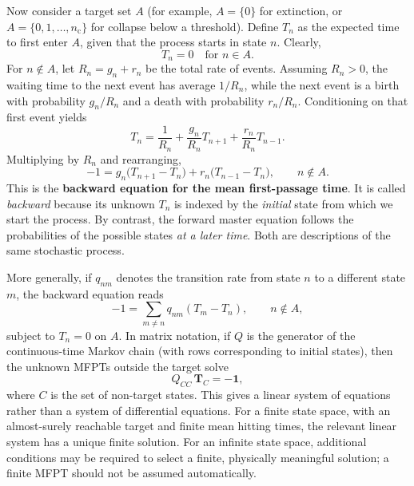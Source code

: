 Now consider a target set $A$ (for example, $A=\{0\}$ for extinction, or
$A=\{0,1,\ldots,n_{\mathrm c}\}$ for collapse below a threshold). Define
$T_n$ as the expected time to first enter $A$, given that the process starts
in state $n$. Clearly,
\begin{equation}
 T_n=0\quad\text{for }n\in A.
 \label{eq:mfpt-target-boundary}
\end{equation}
For $n\notin A$, let $R_n=g_n+r_n$ be the total rate of events. Assuming
$R_n>0$, the waiting time to the next event has average $1/R_n$, while the
next event is a birth with probability $g_n/R_n$ and a death with
probability $r_n/R_n$. Conditioning on that first event yields
\begin{equation}
 T_n=\frac{1}{R_n}
     +\frac{g_n}{R_n}T_{n+1}
     +\frac{r_n}{R_n}T_{n-1}.
 \label{eq:mfpt-first-step}
\end{equation}
Multiplying by $R_n$ and rearranging,
\begin{equation}
 \boxed{-1=g_n\bigl(T_{n+1}-T_n\bigr)
             +r_n\bigl(T_{n-1}-T_n\bigr),
             \qquad n\notin A.}
 \label{eq:mfpt-backward}
\end{equation}
This is the \textbf{backward equation for the mean first-passage time}.
It is called \emph{backward} because its unknown $T_n$ is indexed by the
\emph{initial} state from which we start the process. By contrast, the
forward master equation follows the probabilities of the possible states
\emph{at a later time}. Both are descriptions of the same stochastic process.

More generally, if $q_{nm}$ denotes the transition rate from state $n$ to a
different state $m$, the backward equation reads
\begin{equation}
 -1=\sum_{m\neq n}q_{nm}(T_m-T_n),\qquad n\notin A,
 \label{eq:mfpt-general-generator}
\end{equation}
subject to $T_n=0$ on $A$. In matrix notation, if $Q$ is the generator
of the continuous-time Markov chain (with rows corresponding to initial
states), then the unknown MFPTs outside the target solve
\begin{equation}
 Q_{CC}\,\mathbf T_C=-\mathbf 1,
 \label{eq:mfpt-matrix}
\end{equation}
where $C$ is the set of non-target states. This gives a linear system of
equations rather than a system of differential equations. For a finite
state space, with an almost-surely reachable target and finite mean hitting
times, the relevant linear system has a unique finite solution. For an
infinite state space, additional conditions may be required to select a
finite, physically meaningful solution; a finite MFPT should not be assumed
automatically.

